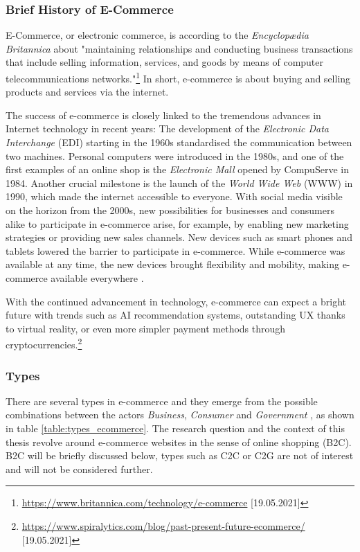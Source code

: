 \subsubsection{Brief History of E-Commerce} %

E-Commerce, or electronic commerce, is according to the \textit{Encyclopædia Britannica} about "maintaining relationships and conducting business transactions that include selling information, services, and goods by means of computer telecommunications networks."\footnote{\url{https://www.britannica.com/technology/e-commerce} [19.05.2021]}
In short, e-commerce is about buying and selling products and services via the internet.

The success of e-commerce is closely linked to the tremendous advances in Internet technology in recent years:
The development of the \textit{Electronic Data Interchange} (EDI) starting in the 1960s standardised the communication between two machines.
Personal computers were introduced in the 1980s, and one of the first examples of an online shop is the \textit{Electronic Mall} opened by CompuServe in 1984.
Another crucial milestone is the launch of the \textit{World Wide Web} (WWW) in 1990, which made the internet accessible to everyone.
With social media visible on the horizon from the 2000s, new possibilities for businesses and consumers alike to participate in e-commerce arise, for example, by enabling new marketing strategies or providing new sales channels.
New devices such as smart phones and tablets lowered the barrier to participate in e-commerce.
While e-commerce was available at any time, the new devices brought flexibility and mobility, making e-commerce available everywhere \cite{2019Hermogeno}.

With the continued advancement in technology, e-commerce can expect a bright future with trends such as AI recommendation systems, outstanding UX thanks to virtual reality, or even more simpler payment methods through cryptocurrencies.\footnote{\url{https://www.spiralytics.com/blog/past-present-future-ecommerce/} [19.05.2021]}


\subsubsection{Types} %

There are several types in e-commerce and they emerge from the possible combinations between the actors \textit{Business}, \textit{Consumer} and \textit{Government} \cite{2017DosSantos}, as shown in table \ref{table:types_ecommerce}.
The research question and the context of this thesis revolve around e-commerce websites in the sense of online shopping (B2C).
B2C will be briefly discussed below, types such as C2C or C2G are not of interest and will not be considered further.

